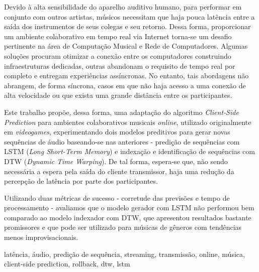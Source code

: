 \resumo
{}

Devido à alta sensibilidade do aparelho auditivo humano, para performar em conjunto com outros artistas, músicos necessitam que haja pouca latência entre a saída dos instrumentos de seus colegas e seu retorno. Dessa forma, proporcionar um ambiente colaborativo em tempo real via Internet torna-se um desafio pertinente na área de Computação Musical e Rede de Computadores. Algumas soluções procuram otimizar a conexão entre os computadores construindo infraestruturas dedicadas, outras abandonam o requisito de tempo real por completo e entregam experiências assíncronas. No entanto, tais abordagens não abrangem, de forma síncrona, casos em que não haja acesso a uma conexão de alta velocidade ou que exista uma grande distância entre os participantes.

Este trabalho propõe, dessa forma, uma adaptação do algoritmo \textit{Client-Side Prediction} para ambientes colaborativos musicais \textit{online}, utilizado originalmente em \textit{videogames}, experimentando dois modelos preditivos para gerar novas sequências de áudio baseando-se nas anteriores - predição de sequências com LSTM (\textit{Long Short-Term Memory}) e indexação e identificação de sequências com DTW (\textit{Dynamic Time Warping}). De tal forma, espera-se que, não sendo necessária a espera pela saída do cliente transmissor, haja uma redução da percepção de latência por parte dos participantes.

Utilizando duas métricas de sucesso - corretude das previsões e tempo de processamento - avaliamos que o modelo gerador com LSTM não performou bem comparado ao modelo indexador com DTW, que apresentou resultados bastante promissores e que pode ser utilizado para músicas de gêneros com tendências menos improvisacionais.

\begin{keywords}
latência, áudio, predição de sequência, streaming, transmissão, online, música, client-side prediction, rollback, dtw, lstm
\end{keywords}
